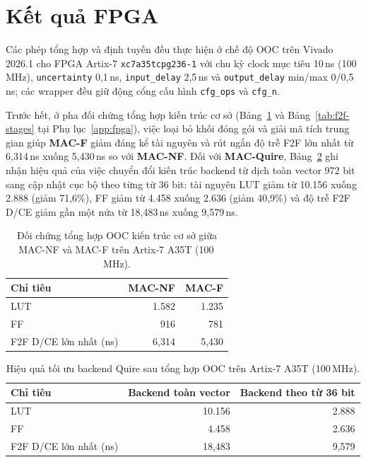 \section{Kết quả FPGA}
Các phép tổng hợp và định tuyến đều thực hiện ở chế độ OOC trên Vivado 2026.1
cho FPGA Artix-7 \texttt{xc7a35tcpg236-1} với chu kỳ clock mục tiêu 10\,ns (100\,MHz),
\texttt{uncertainty} 0,1\,ns, \texttt{input\_delay} 2,5\,ns và \texttt{output\_delay}
min/max 0/0,5\,ns; các wrapper đều giữ động cổng cấu hình \texttt{cfg\_ops} và
\texttt{cfg\_n}.

Trước hết, ở pha đối chứng tổng hợp kiến trúc cơ sở (Bảng~\ref{tab:nf-f-synthesis}
và Bảng~\ref{tab:f2f-stages} tại Phụ lục~\ref{app:fpga}), việc loại bỏ khối đóng gói và giải mã
tích trung gian giúp \textbf{MAC-F} giảm đáng kể tài nguyên và rút ngắn độ trễ
F2F lớn nhất từ 6,314\,ns xuống 5,430\,ns so với \textbf{MAC-NF}. Đối với
\textbf{MAC-Quire}, Bảng~\ref{tab:quire-synthesis} ghi nhận hiệu quả của việc
chuyển đổi kiến trúc backend từ dịch toàn vector 972 bit sang cập nhật cục bộ
theo từng từ 36 bit: tài nguyên LUT giảm từ 10.156 xuống 2.888 (giảm 71,6\%), FF
giảm từ 4.458 xuống 2.636 (giảm 40,9\%) và độ trễ F2F D/CE giảm gần một nửa từ
18,483\,ns xuống 9,579\,ns.

\begin{table}[htbp]
  \centering
  \caption{Đối chứng tổng hợp OOC kiến trúc cơ sở giữa MAC-NF và MAC-F trên Artix-7 A35T (100\,MHz).}
  \label{tab:nf-f-synthesis}
  \begin{tabular}{lrr}
    \hline
    Chỉ tiêu & MAC-NF & MAC-F \\
    \hline
    LUT & 1.582 & 1.235 \\
    FF & 916 & 781 \\
    F2F D/CE lớn nhất (ns) & 6,314 & 5,430 \\
    \hline
  \end{tabular}
\end{table}

\begin{table}[htbp]
  \centering
  \caption{Hiệu quả tối ưu backend Quire sau tổng hợp OOC trên Artix-7 A35T (100\,MHz).}
  \label{tab:quire-synthesis}
  \begin{tabular}{lrr}
    \hline
    Chỉ tiêu & Backend toàn vector & Backend theo từ 36 bit \\
    \hline
    LUT & 10.156 & 2.888 \\
    FF & 4.458 & 2.636 \\
    F2F D/CE lớn nhất (ns) & 18,483 & 9,579 \\
    \hline
  \end{tabular}
\end{table}


